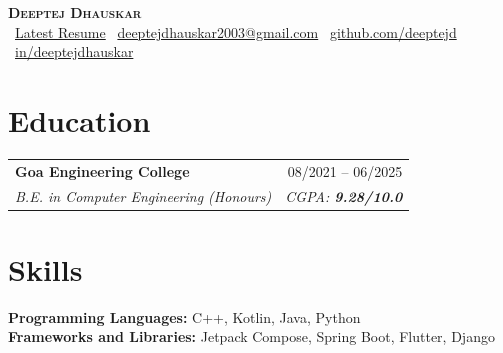 \documentclass[a4paper, 11pt]{article}
\makeatletter
\newcommand{\resumeSubheading}[4]{
  \item
  \begin{tabular*}{1.0\textwidth}[t]{l@{\extracolsep{\fill}}r}
    \textbf{#1} & #2 \\
    \textit{\small #3} & \textit{\small #4}
  \end{tabular*}
}
\makeatother
\begin{document}
\begin{center}
    \textbf{\Huge \scshape \textcolor{headingBlue}{Deeptej Dhauskar}} \\ \vspace{8pt}
    \small 
    \faLink\ 
    \href{https://deeptejd.github.io/resume}{Latest Resume} \quad
    \faEnvelope\ 
    \href{mailto:deeptejdhauskar2003@gmail.com}{deeptejdhauskar2003@gmail.com} \quad
    \faGithub\ 
    \href{https://github.com/deeptejd}{github.com/deeptejd} \quad
    \faLinkedin\ 
    \href{https://linkedin.com/in/deeptejdhauskar}{in/deeptejdhauskar}
\end{center}

\section{Education}
\begin{outerlist}
    \resumeSubheading
      {Goa Engineering College}{08/2021 -- 06/2025}
      {B.E. in Computer Engineering (Honours)}{CGPA: \textbf{9.28/10.0}}
      
\end{outerlist}

\section{Skills}
\noindent
\textbf{Programming Languages:} C++, Kotlin, Java, Python \\
\textbf{Frameworks and Libraries:} Jetpack Compose, Spring Boot, Flutter, Django

\end{document}
